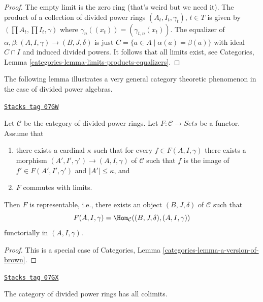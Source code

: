 \begin{proof}
The empty limit is the zero ring (that's weird but we need it).
The product of a collection of divided power rings $(A_t, I_t, \gamma_t)$,
$t \in T$ is given by $(\prod A_t, \prod I_t, \gamma)$ where
$\gamma_n((x_t)) = (\gamma_{t, n}(x_t))$.
The equalizer of $\alpha, \beta : (A, I, \gamma) \to (B, J, \delta)$
is just $C = \{a \in A \mid \alpha(a) = \beta(a)\}$ with ideal $C \cap I$
and induced divided powers. It follows that all limits exist, see
Categories, Lemma \ref{categories-lemma-limits-products-equalizers}.
\end{proof}

The following lemma illustrates a very general category theoretic
phenomenon in the case of divided power algebras.

\begin{lemma}
\label{dpa-lemma-a-version-of-brown}
\href{https://stacks.math.columbia.edu/tag/07GW}{\texttt{Stacks tag 07GW}}

Let $\mathcal{C}$ be the category of divided power rings. Let
$F : \mathcal{C} \to \textit{Sets}$ be a functor.
Assume that
\begin{enumerate}
\item there exists a cardinal $\kappa$ such that for every
$f \in F(A, I, \gamma)$ there exists a morphism
$(A', I', \gamma') \to (A, I, \gamma)$ of $\mathcal{C}$ such that $f$
is the image of $f' \in F(A', I', \gamma')$ and $|A'| \leq \kappa$, and
\item $F$ commutes with limits.
\end{enumerate}
Then $F$ is representable, i.e., there exists an object $(B, J, \delta)$
of $\mathcal{C}$ such that
$$
F(A, I, \gamma) = \Hom_\mathcal{C}((B, J, \delta), (A, I, \gamma))
$$
functorially in $(A, I, \gamma)$.
\end{lemma}

\begin{proof}
This is a special case of
Categories, Lemma \ref{categories-lemma-a-version-of-brown}.
\end{proof}

\begin{lemma}[Colimits]
\label{dpa-lemma-colimits}
\href{https://stacks.math.columbia.edu/tag/07GX}{\texttt{Stacks tag 07GX}}

The category of divided power rings has all colimits.
\end{lemma}

